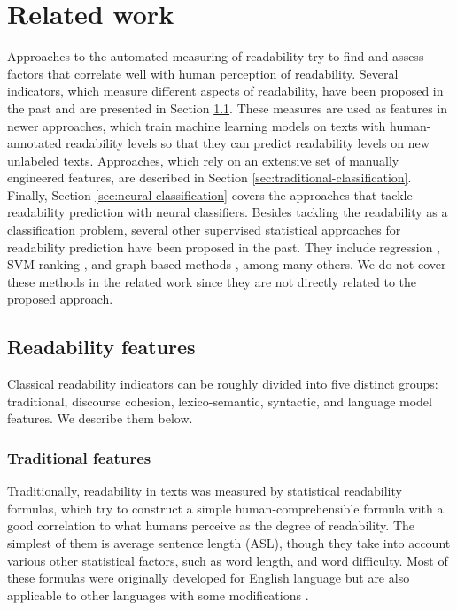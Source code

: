 \documentclass{clv3}
\begin{document}
\section{Related work}
\label{related-work}
Approaches to the automated measuring of readability try to find and assess factors that correlate well with human perception of readability. Several indicators, which measure different aspects of readability, have been proposed in the past and are presented in Section \ref{sec:readability-features}. These measures are used as features in newer approaches, which train machine learning models on texts with human-annotated readability levels so that they can predict readability levels on new unlabeled texts. Approaches, which rely on an extensive set of manually engineered features, are described in Section \ref{sec:traditional-classification}. Finally, Section \ref{sec:neural-classification} covers the approaches that tackle readability prediction with neural classifiers. Besides tackling the readability as a classification problem, several other supervised statistical approaches for readability prediction have been proposed in the past. They include regression \citep{sheehan2010generating}, SVM ranking \citep{ma2012ranking}, and graph-based methods \citep{jiang2015domain}, among many others. We do not cover these methods in the related work since they are not directly related to the proposed approach.

\subsection{Readability features}
\label{sec:readability-features}

Classical readability indicators can be roughly divided into five distinct groups: traditional, discourse cohesion, lexico-semantic, syntactic, and language model features. We describe them below.

\subsubsection{Traditional features}
\label{sec:formulas}
Traditionally, readability in texts was measured by statistical readability formulas, which try to construct a simple human-comprehensible formula with a good correlation to what humans perceive as the degree of readability. The simplest of them is average sentence length (ASL), though they take into account various other statistical factors, such as word length, and word difficulty. Most of these formulas were originally developed for English language but are also applicable to other languages with some modifications \citep{vskvorcevaluation}.
\end{document}

